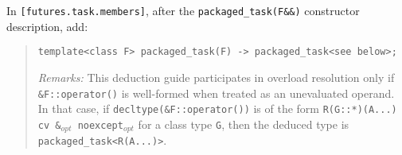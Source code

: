 \documentclass[11pt]{article}
\begin{document}
In \texttt{[futures.task.members]}, after the
\texttt{packaged\_task(F\&\&)} constructor description, add:

\begin{quote}
\texttt{template<class F> packaged\_task(F) -> packaged\_task<see below>;}

\textit{Remarks:} This deduction guide participates in overload
resolution only if \texttt{\&F​::​operator()} is well-formed when treated
as an unevaluated operand.  In that case, if
\texttt{decltype(\&F​::​operator())} is of the form
\texttt{R(G​::​*)(A...) cv \&$_{opt}$ noexcept$_{opt}$} for a class type
\texttt{G}, then the deduced type is \texttt{packaged\_task<R(A...)>}.
\end{quote}




%
%
\end{document}
